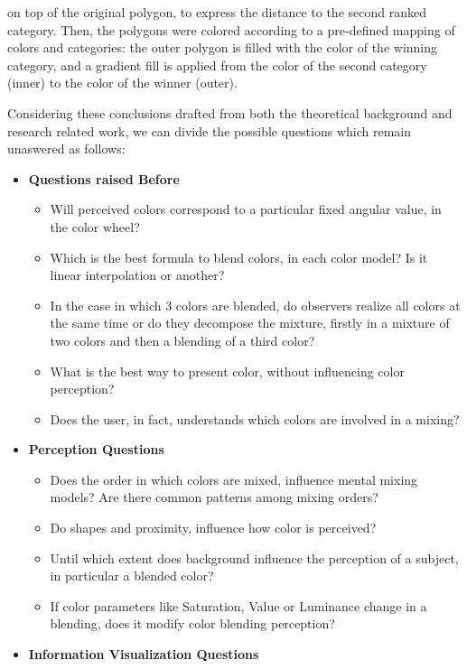 on top of the original polygon, to express the distance to the second ranked category. Then, the polygons were colored according to
a pre-defined mapping of colors and categories: the outer polygon is filled with the color of the winning category, and a gradient fill is
applied from the color of the second category (inner) to the color of the winner (outer). \par
%
Considering these conclusions drafted from both the theoretical background and research related work, we can divide the
possible questions which remain unaswered as follows:
%
\begin{itemize}
	\setlength\itemsep{0.1em}
	\item \textbf{Questions raised Before}
    \begin{itemize}
    	\setlength\itemsep{0.01em}
			\item Will perceived colors correspond to a particular fixed angular value, in the color wheel?
      \item Which is the best formula to blend colors, in each color model? Is it linear interpolation or another?
      \item In the case in which 3 colors are blended, do observers realize all colors at the same time or do they
			decompose the mixture, firstly in a mixture of two colors and then a blending of a third color?
      \item What is the best way to present color, without influencing color perception?
      \item Does the user, in fact, understands which colors are involved in a mixing?
		\end{itemize}
  \item \textbf{Perception Questions}
    \begin{itemize}
    	\setlength\itemsep{0.01em}
    	\item Does the order in which colors are mixed, influence mental mixing models? Are there common patterns among mixing orders?
      \item Do shapes and proximity, influence how color is perceived?
      \item Until which extent does background influence the perception of a subject, in particular a blended color?
      \item If color parameters like Saturation, Value or Luminance change in a blending, does it modify color blending perception?
    \end{itemize}
  \item \textbf{Information Visualization Questions}

\end{itemize}
